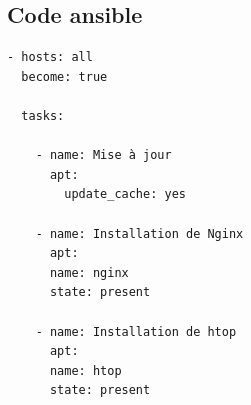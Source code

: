 \documentclass[]{article}
\begin{document}
\subsection*{Code ansible}
\begin{verbatim}
- hosts: all
  become: true

  tasks:  

    - name: Mise à jour 
      apt:
        update_cache: yes

    - name: Installation de Nginx
      apt:
      name: nginx
      state: present

    - name: Installation de htop
      apt:
      name: htop
      state: present
\end{verbatim}
\end{document}
